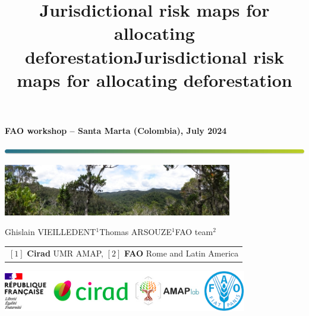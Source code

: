 \documentclass[10pt,table,dvipsnames,compress]{beamer}
\date{}
\title{Jurisdictional risk maps for allocating deforestation}
\title[riskmaps]{Jurisdictional risk maps for allocating deforestation}
\begin{document}


{
  \begin{frame}
  \begin{center}
  \small{\textbf{FAO workshop -- Santa Marta (Colombia), July 2024}}
  \end{center}
  \vspace{-0.5cm}
  \titlepage %
  \vspace{-3cm}
  \begin{center}
    \includegraphics[width=\textwidth]{figs/Barre_couleur}
    
    \vspace{0.25cm}
    
    \includegraphics[width=10cm]{figs/Banniere}
    
    \small{Ghislain VIEILLEDENT$^{1}$\hspace{0.25cm}Thomas ARSOUZE$^{1}$\hspace{0.25cm}FAO team$^{2}$}
      
    \vspace{0.25cm}
    
    {\scriptsize
      \begin{tabular}{l}
        $[1]$ \textbf{Cirad} UMR AMAP, $[2]$ \textbf{FAO} Rome and Latin America
      \end{tabular}
    }
    
    \includegraphics[width=0.8\textwidth]{figs/partners_logos}
    
  \end{center}
  \end{frame}
}
\end{document}

